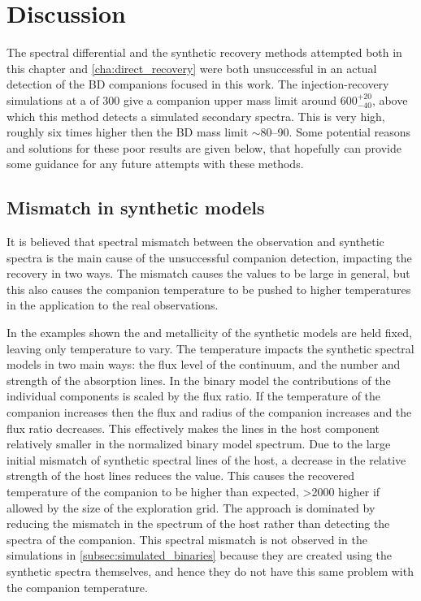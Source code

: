 
\section{Discussion}
\label{sec:chisquared_discussion}
The spectral differential and the synthetic recovery methods attempted both in this chapter and \cref{cha:direct_recovery} were both unsuccessful in an actual detection of the {BD} companions focused in this work.
The injection-recovery simulations at a \snr{} of 300 give a companion upper mass limit around \(600^{+20}_{-40}\), above which this method detects a simulated secondary spectra.
This is very high, roughly six times higher then the {BD} mass limit \(\sim\)80--90\Mjup{}.
Some potential reasons and solutions for these poor results are given below, that hopefully can provide some guidance for any future attempts with these methods.

\subsection{Mismatch in synthetic models}
\label{subsec:mismatch}
It is believed that spectral mismatch between the observation and synthetic spectra is the main cause of the unsuccessful companion detection, impacting the recovery in two ways.
The mismatch causes the \textchisquared{} values to be large in general, but this also causes the companion temperature to be pushed to higher temperatures in the application to the real observations.

In the examples shown the \Logg{} and metallicity of the synthetic models are held fixed, leaving only temperature to vary.
The temperature impacts the synthetic spectral models in two main ways: the flux level of the continuum, and the number and strength of the absorption lines.
In the binary model the contributions of the individual components is scaled by the flux ratio.
If the temperature of the companion increases then the flux and radius of the companion increases and the flux ratio \FoneFtwo{} decreases.
This effectively makes the lines in the host component relatively smaller in the normalized binary model spectrum.
Due to the large initial mismatch of synthetic spectral lines of the host, a decrease in the relative strength of the host lines reduces the \textchisquared{} value.
This causes the recovered temperature of the companion to be higher than expected, >2000\K{} higher if allowed by the size of the exploration grid.
The \textchisquared{} approach is dominated by reducing the mismatch in the spectrum of the host rather than detecting the spectra of the companion.
This spectral mismatch is not observed in the simulations in \cref{subsec:simulated_binaries} because they are created using the synthetic spectra themselves, and hence they do not have this same problem with the companion temperature.

